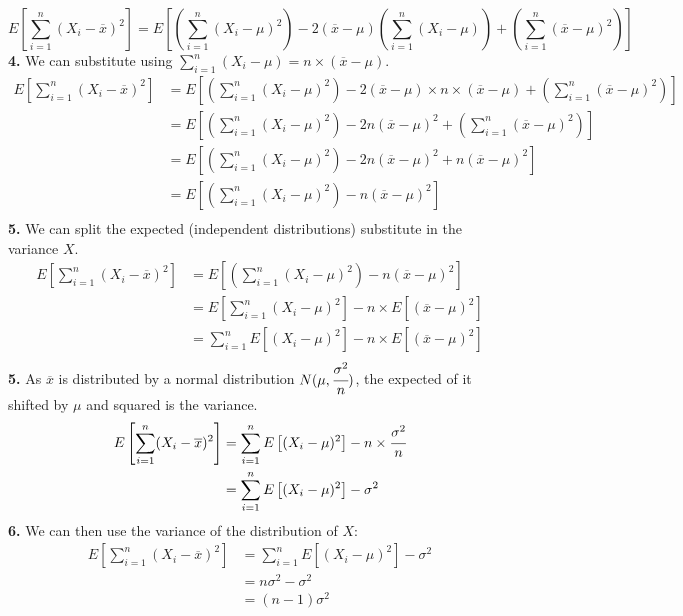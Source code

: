 \[E\left[ \sum_{i = 1}^n ( X_i - \overline{x} )^2 \right] = E\left[ \left( \sum_{i = 1}^n (X_i - \mu)^2 \right) - 2(\overline{x} - \mu)\left( \sum_{i = 1}^n (X_i - \mu) \right) + \left( \sum_{i = 1}^n(\overline{x} - \mu)^2 \right) \right]\]
\textbf{4. } We can substitute using $\sum_{i = 1}^n (X_i - \mu) = n \times (\overline{x} - \mu)$.
\[\begin{split}
		E\left[ \sum_{i = 1}^n ( X_i - \overline{x} )^2 \right] &= E\left[ \left( \sum_{i = 1}^n (X_i - \mu)^2 \right) - 2(\overline{x} - \mu) \times n \times (\overline{x} - \mu) + \left( \sum_{i = 1}^n(\overline{x} - \mu)^2 \right) \right] \\
		&= E\left[ \left( \sum_{i = 1}^n (X_i - \mu)^2 \right) - 2n(\overline{x} - \mu)^2 + \left( \sum_{i = 1}^n(\overline{x} - \mu)^2 \right) \right] \\
		&= E\left[ \left( \sum_{i = 1}^n (X_i - \mu)^2 \right) - 2n(\overline{x} - \mu)^2 + n(\overline{x} - \mu)^2 \right] \\
		&= E\left[ \left( \sum_{i = 1}^n (X_i - \mu)^2 \right) - n(\overline{x} - \mu)^2 \right] \\
	\end{split}\]
\textbf{5. } We can split the expected (independent distributions) substitute in the variance $X$.
\[\begin{split}
		E\left[ \sum_{i = 1}^n ( X_i - \overline{x} )^2 \right] &= E\left[ \left( \sum_{i = 1}^n (X_i - \mu)^2 \right) - n(\overline{x} - \mu)^2 \right] \\
		&= E \left[ \sum_{i = 1}^n (X_i - \mu)^2 \right] - n \times E\left[ \left( \overline{x} - \mu \right)^2 \right]\\
		&= \sum_{i = 1}^n E\left[ (X_i - \mu)^2 \right] - n \times E\left[ \left( \overline{x} - \mu \right)^2 \right]\\
	\end{split}\]
\textbf{5. } As $\overline{x}$ is distributed by a normal distribution $N(\mu, \cfrac{\sigma^2}{n})$, the expected of it shifted by $\mu$ and squared is the variance.
\[\begin{split}
		E\left[ \sum_{i = 1}^n ( X_i - \overline{x} )^2 \right] &= \sum_{i = 1}^n E\left[ (X_i - \mu)^2 \right] - n \times \cfrac{\sigma^2}{n}\\
		&= \sum_{i = 1}^n E\left[ (X_i - \mu)^2 \right] - \sigma^2\\
	\end{split}\]
\textbf{6. } We can then use the variance of the distribution of $X$:
\[\begin{split}
		E\left[ \sum_{i = 1}^n ( X_i - \overline{x} )^2 \right] &= \sum_{i = 1}^n E\left[ (X_i - \mu)^2 \right] - \sigma^2\\
		&= n \sigma^2 - \sigma^2\\
		&= (n - 1) \sigma^2\\
	\end{split}\]
